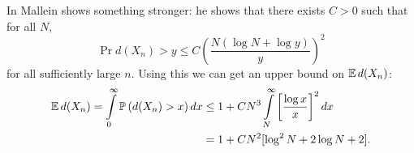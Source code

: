 \begin{remark}
In \cite{mallein2018n} Mallein shows something stronger: he shows that there exists $C > 0$ such that for all $N$, 
\begin{equation}\nonumber
\Pr{d(X_n) > y} \leq C \left( \frac{N(\log N + \log y)}{y}\right)^2
\end{equation}
for all sufficiently large $n$. Using this we can get an upper bound on $\mathbb{E}\, d(X_n)$:
\begin{align*}
\mathbb{E}\, d(X_n) = \int\limits_0^\infty \mathbb{P} \left( d(X_n) > x \right) dx &\leq 1 + C N^3 \int\limits^\infty_N \left[\frac{\log x}{x}\right]^2 dx \\
													  &= 1 + C N^2[ \log^2 N + 2 \log N + 2]. 
\end{align*}
\end{remark}



